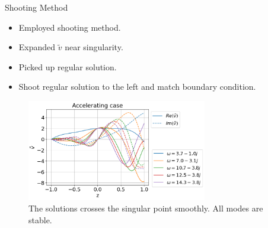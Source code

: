 \begin{frame}{Shooting Method}
  \begin{itemize}
    \item Employed shooting method.
    \item Expanded $\tilde{v}$ near singularity.
    \item Picked up regular solution.
    \item Shoot regular solution to the left and match boundary condition.
  \end{itemize}
  \begin{figure}[htbp]
    \begin{center}
      \includegraphics[width=0.7\textwidth]{figures/results-accelerating-v.png}
    \end{center}
    \caption{The solutions crosses the singular point smoothly. All modes are stable.}
    \label{fig:good-accelerating-v}
  \end{figure}
\end{frame}
